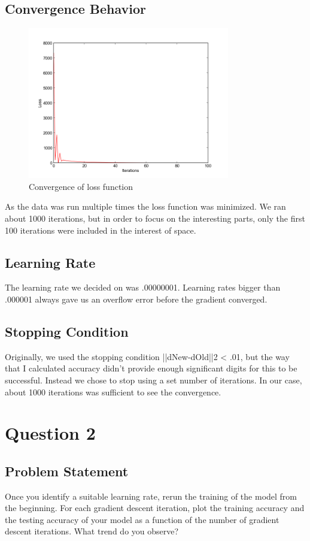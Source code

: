 \documentclass[letterpaper,10pt]{article}
\begin{document}
\subsection{Convergence Behavior}
     \begin{figure}[ht]
    \centering
   \includegraphics[width=250pt]{convergenceClose.png}
    \caption{Convergence of loss function}
    \label{fig:Convergence of loss function over iterations}
    \end{figure}
As the data was run multiple times the loss function was minimized.
We ran about 1000 iterations, but in order to focus on the interesting parts, only the first 100 iterations were included in the interest of space.   

\subsection{Learning Rate}
The learning rate we decided on was .00000001. 
Learning rates bigger than .000001 always gave us an overflow error before the gradient converged.
\subsection{Stopping Condition}
Originally, we used the stopping condition ||dNew-dOld||2 < .01, but the way that I calculated accuracy didn't provide enough significant digits for this to be successful.
Instead we chose to stop using a set number of iterations. In our case, about 1000 iterations was sufficient to see the convergence.  

\section{Question 2}
\subsection{Problem Statement}
Once you identify a suitable learning rate, rerun the training of the model from the beginning. For 
each gradient descent iteration, plot the training accuracy and the testing accuracy of your model 
as a function of the number of gradient descent iterations. What trend do you observe?
\end{document}
